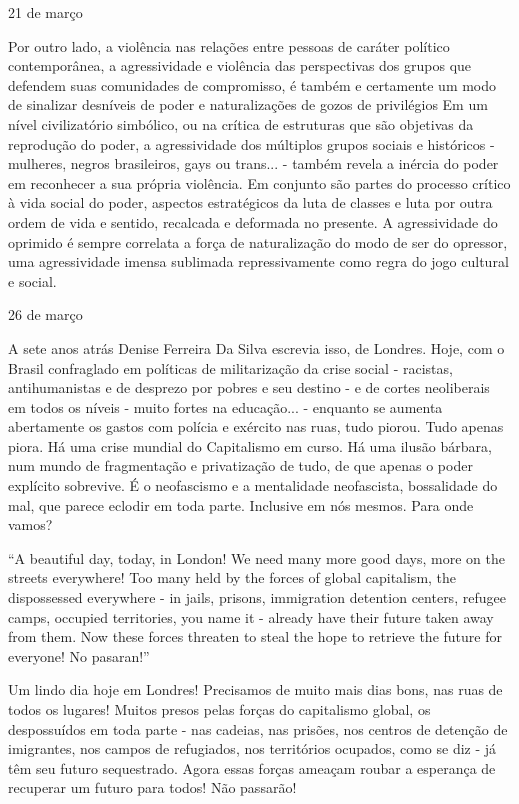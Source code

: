 \begin{flushright}
21 de março
\end{flushright}

Por outro lado, a violência nas relações entre pessoas de caráter
político contemporânea, a agressividade e violência das perspectivas dos
grupos que defendem suas comunidades de compromisso, é também e
certamente um modo de sinalizar desníveis de poder e naturalizações de
gozos de privilégios Em um nível civilizatório simbólico, ou na crítica
de estruturas que são objetivas da reprodução do poder, a agressividade
dos múltiplos grupos sociais e históricos - mulheres, negros
brasileiros, gays ou trans... - também revela a inércia do poder em
reconhecer a sua própria violência. Em conjunto são partes do processo
crítico à vida social do poder, aspectos estratégicos da luta de classes
e luta por outra ordem de vida e sentido, recalcada e deformada no
presente. A agressividade do oprimido é sempre correlata a força de
naturalização do modo de ser do opressor, uma agressividade imensa
sublimada repressivamente como regra do jogo cultural e social.

\begin{flushright}
26 de março
\end{flushright}

A sete anos atrás Denise Ferreira Da Silva escrevia isso, de Londres.
Hoje, com o Brasil confraglado em políticas de militarização da crise
social - racistas, antihumanistas e de desprezo por pobres e seu destino
- e de cortes neoliberais em todos os níveis - muito fortes na
educação... - enquanto se aumenta abertamente os gastos com polícia e
exército nas ruas, tudo piorou. Tudo apenas piora. Há uma crise mundial
do Capitalismo em curso. Há uma ilusão bárbara, num mundo de
fragmentação e privatização de tudo, de que apenas o poder explícito
sobrevive. É o neofascismo e a mentalidade neofascista, bossalidade do
mal, que parece eclodir em toda parte. Inclusive em nós mesmos. Para
onde vamos?

``A beautiful day, today, in London! We need many more good days, more
on the streets everywhere! Too many held by the forces of global
capitalism, the dispossessed everywhere - in jails, prisons, immigration
detention centers, refugee camps, occupied territories, you name it -
already have their future taken away from them. Now these forces
threaten to steal the hope to retrieve the future for everyone! No
pasaran!''

Um lindo dia hoje em Londres! Precisamos de muito mais dias bons, nas
ruas de todos os lugares! Muitos presos pelas forças do capitalismo
global, os despossuídos em toda parte - nas cadeias, nas prisões, nos
centros de detenção de imigrantes, nos campos de refugiados, nos
territórios ocupados, como se diz - já têm seu futuro sequestrado. Agora
essas forças ameaçam roubar a esperança de recuperar um futuro para
todos! Não passarão!

